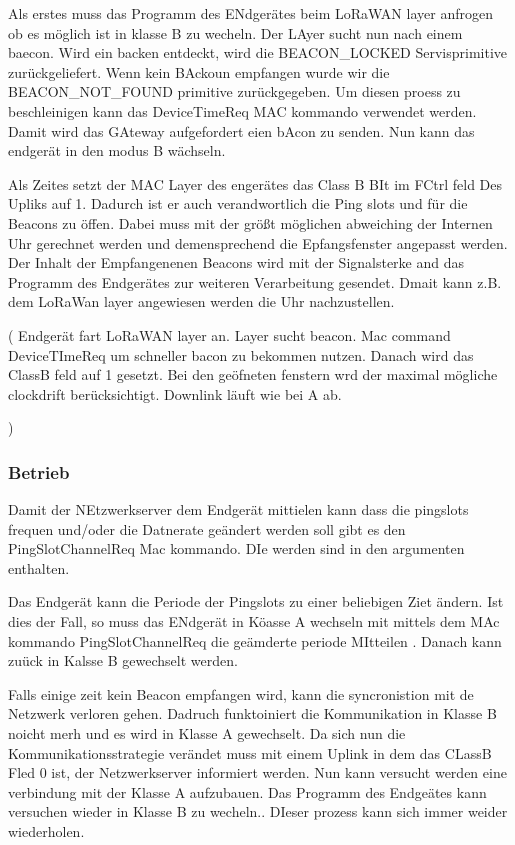 \documentclass[a4paper,12pt]{article}
\begin{document}
                Als erstes muss das Programm des ENdgerätes beim LoRaWAN layer anfrogen ob es möglich ist in klasse B zu wecheln. Der LAyer sucht nun nach einem baecon. Wird ein backen entdeckt, wird die BEACON\_LOCKED Servisprimitive  zurückgeliefert. Wenn kein BAckoun empfangen wurde wir die BEACON\_NOT\_FOUND
                primitive zurückgegeben. Um diesen proess zu beschleinigen kann das DeviceTimeReq MAC kommando verwendet werden. Damit wird das GAteway aufgefordert eien bAcon zu senden. Nun kann das endgerät in den modus B wächseln.

                Als Zeites setzt der MAC Layer des engerätes das Class B BIt im FCtrl feld Des Upliks auf 1. Dadurch ist er auch verandwortlich die
                Ping slots und für die Beacons zu öffen. Dabei muss mit der größt möglichen abweiching der Internen Uhr gerechnet werden und demensprechend die Epfangsfenster angepasst werden.
                Der Inhalt der Empfangenenen Beacons wird mit der Signalsterke and das Programm des Endgerätes zur weiteren Verarbeitung gesendet. 
                Dmait kann z.B. dem LoRaWan layer angewiesen werden die Uhr nachzustellen. 

                \cite{LoRaSpec}(
                    Endgerät fart LoRaWAN layer an. Layer sucht beacon. Mac command DeviceTImeReq um schneller bacon zu bekommen nutzen. Danach wird das ClassB feld auf 1 gesetzt. Bei den geöfneten fenstern wrd der maximal mögliche clockdrift berücksichtigt.
                    Downlink läuft wie bei A ab.


                )
            \subsubsection{Betrieb}
                
                Damit der NEtzwerkserver dem Endgerät mittielen kann dass die pingslots frequen und/oder die Datnerate geändert werden soll gibt es den PingSlotChannelReq Mac kommando. DIe werden sind in den argumenten enthalten.
                    
                Das Endgerät kann die Periode der Pingslots zu einer beliebigen Ziet ändern. Ist dies der Fall, so muss das ENdgerät in Köasse A wechseln mit mittels dem MAc kommando
                PingSlotChannelReq die geämderte periode MItteilen . Danach kann zuück in Kalsse B gewechselt werden.

                Falls einige zeit kein Beacon empfangen wird, kann die syncronistion mit de Netzwerk verloren gehen. Dadruch funktoiniert die Kommunikation in Klasse B noicht merh und es wird in Klasse A gewechselt. Da sich nun die 
                Kommunikationsstrategie verändet muss mit einem Uplink in dem das CLassB Fled 0 ist, der Netzwerkserver informiert werden. Nun kann versucht werden eine verbindung mit der Klasse A aufzubauen. Das Programm des Endgeätes kann versuchen
                wieder in Klasse B zu wecheln.. DIeser prozess kann sich immer weider wiederholen.
\end{document}
